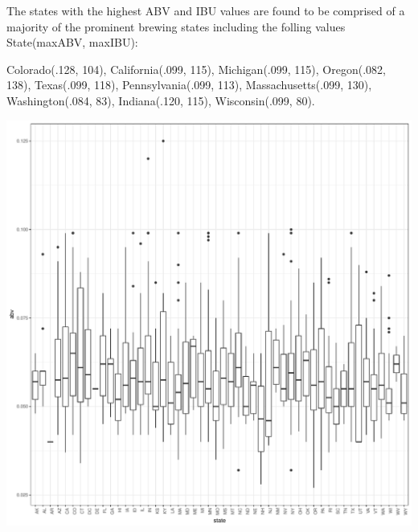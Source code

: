 \documentclass[]{article}
\newenvironment{Shaded}{\begin{snugshade}}{\end{snugshade}}
\newcommand{\KeywordTok}[1]{\textcolor[rgb]{0.13,0.29,0.53}{\textbf{#1}}}
\newcommand{\DataTypeTok}[1]{\textcolor[rgb]{0.13,0.29,0.53}{#1}}
\newcommand{\DecValTok}[1]{\textcolor[rgb]{0.00,0.00,0.81}{#1}}
\newcommand{\StringTok}[1]{\textcolor[rgb]{0.31,0.60,0.02}{#1}}
\newcommand{\CommentTok}[1]{\textcolor[rgb]{0.56,0.35,0.01}{\textit{#1}}}
\newcommand{\OperatorTok}[1]{\textcolor[rgb]{0.81,0.36,0.00}{\textbf{#1}}}
\newcommand{\NormalTok}[1]{#1}
\begin{document}
The states with the highest ABV and IBU values are found to be comprised
of a majority of the prominent brewing states including the folling
values State(maxABV, maxIBU):

Colorado(.128, 104), California(.099, 115), Michigan(.099, 115),
Oregon(.082, 138), Texas(.099, 118), Pennsylvania(.099, 113),
Massachusetts(.099, 130), Washington(.084, 83), Indiana(.120, 115),
Wisconsin(.099, 80).

\begin{Shaded}
\end{Shaded}

\begin{center}\includegraphics{Analysis_Final_files/figure-latex/unnamed-chunk-19-1} \end{center}
\end{document}
